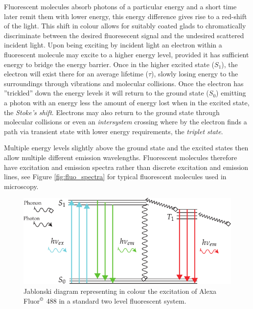 Fluorescent molecules absorb photons of a particular energy and a short time later remit them with lower energy, this energy difference gives rise to a red-shift of the light.
This shift in colour allows for suitably coated glads to chromatically discriminate between the desired fluoresecent signal and the undesired scattered incident light.
Upon being exciting by incident light an electron within a fluorescent molecule may excite to a higher energy level, provided it has sufficient energy to bridge the energy barrier.
Once in the higher excited state ($S_1$), the electron will exist there for an average lifetime ($\tau$), slowly losing energy to the surroundings through vibrations and molecular collisions.
Once the electron has ''trickled'' down the energy levels it will return to the ground state ($S_0$) emitting a photon with an energy less the amount of energy lost when in the excited state, the \emph{Stoke's shift}.
Electrons may also return to the ground state through molecular collisions or even an \emph{intersystem} crossing where by the electron finds a path via transient state with lower energy requirements, the \emph{triplet state}.


Multiple energy levels slightly above the ground state and the excited states then allow multiple different emission wavelengths.
Fluorescent molecules therefore have excitation and emission spectra rather than discrete excitation and emission lines, see Figure \ref{fig:fluo_spectra} for typical fluorescent molecules used in microscopy.

\begin{figure}
    \centering
    \includegraphics[width=0.7\linewidth]{jablonski_triplet_new}
    \caption[Standard jablonski diagram]{Jablonski diagram representing in colour the excitation of Alexa Fluor\(^{\copyright}\) 488 in a standard two level fluorescent system.}\label{fig:jablonski_triplet_new}
\end{figure}


